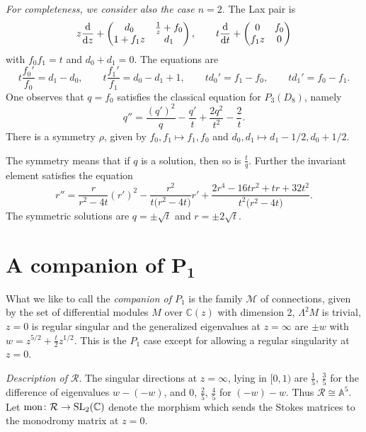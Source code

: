 \documentclass[10pt,a4paper]{amsart}
\numberwithin{equation}{section}
\begin{document}
 {\it For completeness, we consider also the case $n=2$}.
The Lax pair is
\[
z\frac{{\rm d}}{{\rm d}z}+\begin{pmatrix}
d_0&\frac{1}{z}+f_0\\
1+f_1z&d_1\end{pmatrix},\qquad
t\frac{{\rm d}}{{\rm d}t}+\begin{pmatrix}0& f_0\\
f_1z & 0
\end{pmatrix}
\]
 with
$f_0f_1=t$ and $d_0+d_1=0$. The equations are
\[t\frac{f_0'}{f_0}=d_1-d_0,\qquad t\frac{f_1'}{f_1}=d_0-d_1+1, \qquad td_0'=f_1-f_0,\qquad td_1'=f_0-f_1.\]
One observes that $q=f_0$ satisfies the classical equation for $P_3(D_8)$, namely{\samepage
\[
q''=\frac{(q')^2}{q}-\frac{q'}{t}+\frac{2q^2}{t^2}-\frac{2}{t}.
\]
There is a symmetry $\rho$, given by $f_0,f_1\mapsto f_1,f_0$ and $d_0, d_1\mapsto d_1-1/2, d_0+1/2$.}


 The symmetry means that if $q$ is a solution, then so is $\frac{t}{q}$. Further the invariant element  satisfies the equation
 \[ r''=\frac{r}{r^2-4t}(r')^2-\frac{r^2}{t\bigl(r^2-4t\bigr)}r'+\frac{2r^4-16tr^2+tr+32t^2}{t^2\bigl(r^2-4t\bigr)}. \]
 The symmetric solutions are $q=\pm \sqrt{t}$ and $r=\pm 2\sqrt{t}$.


\section[A companion of P\_1]{A companion of $\boldsymbol{P_1}$} \label{thirteen}

What we like to call the {\it companion of $P_1$} is the family $\mathcal{M}$ of connections, given by the set of differential modules $M$ over
$\mathbb{C}(z)$ with dimension 2, $\Lambda ^2M$ is trivial, $z=0$ is regular singular and the generalized eigenvalues at $z=\infty$ are $\pm w$ with
$w=z^{5/2}+\frac{t}{2}z^{1/2}$. This is the $P_1$ case except for allowing a regular singularity at $z=0$.



 {\it Description of $\mathcal{R}$}. The singular directions at $z=\infty$, lying in $[0,1)$
are $\frac{1}{5}$, $\frac{3}{5}$ for the difference of eigenvalues $w-(-w)$, and $0$, $\frac{2}{5}$, $\frac{4}{5}$ for
$(-w)-w$. Thus $\mathcal{R}\cong \mathbb{A}^5$. Let $\operatorname{mon}\colon \mathcal{R}\rightarrow {\rm SL}_2(\mathbb{C})$
 denote the morphism which sends the Stokes matrices to the monodromy matrix at $z=0$.
\end{document}
